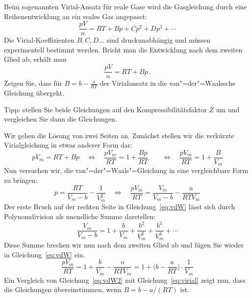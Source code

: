 \documentclass[DIV11]{scrartcl}
\begin{document}
\begin{question}[name=Virial-Ansatz]
Beim sogenannten Virial-Ansatz für reale Gase wird die Gasgleichung durch eine
Reihenentwicklung an ein reales Gas angepasst: \[\frac{pV}{n} = RT + Bp + Cp^2
+ Dp^3 + \cdots\]  Die Virial-Koeffizienten $B,C,D\ldots$ sind druckunabhängig
und müssen experimentell bestimmt werden. Bricht man die Entwicklung nach dem
zweiten Glied ab, erhält man \[\frac{pV}{n} = RT + Bp \,.\]  Zeigen Sie, dass
für $B=b-\frac{a}{RT}$ der Virialansatz in die van"=der"=Waalssche Gleichung
übergeht.

Tipp: stellen Sie beide Gleichungen auf den Kompressibilitätsfaktor $Z$ um und
vergleichen Sie dann die Gleichungen.
\end{question}
\begin{solution}[name=Virial-Ansatz]
  Wir gehen die Lösung von zwei Seiten an. Zunächst stellen wir die verkürzte
  Virialgleichung in etwas anderer Form dar:
  \begin{equation}
    pV_m = RT + Bp
    \quad\Leftrightarrow\quad
    \frac{pV_m}{RT} = 1 + \frac{Bp}{RT}
    \qquad\Leftrightarrow\quad
    \frac{pV_m}{RT} = 1 + \frac{B}{V_m} \label{eq:virial}
  \end{equation}
  Nun versuchen wir, die van"=der"=Waals"=Gleichung in eine vergleichbare Form
  zu bringen:
  \begin{equation}
    p = \frac{RT}{V_m-b} - \frac{1}{V_m^2}
    \quad\Leftrightarrow\quad
    \frac{pV_m}{RT} = \frac{V_m}{V_m-b} - \frac{a}{RTV_m} \label{eq:vdW}
  \end{equation}
  Der erste Bruch auf der rechten Seite in Gleichung~\eqref{eq:vdW} lässt sich
  durch Polynomdivision als unendliche Summe darstellen:
  \begin{equation}
    \frac{V_m}{V_m-b}
      = 1 + \frac{b}{V_m} + \frac{b^2}{V_m^2} + \frac{b^3}{V_m^3} + \cdots
      \label{eq:inv-sum}
  \end{equation}
  Diese Summe brechen wir nun nach dem zweiten Glied ab und fügen Sie wieder
  in Gleichung~\eqref{eq:vdW} ein.
  \begin{equation}
    \frac{pV_m}{RT}
      = 1 + \frac{b}{V_m} - \frac{a}{RTV_m}
      = 1 + \biggl(b-\frac{a}{RT}\biggr)\cdot\frac{1}{V_m} \label{eq:vdW2}
  \end{equation}
  Ein Vergleich von Gleichung~\eqref{eq:vdW2} mit Gleichung~\eqref{eq:virial}
  zeigt nun, dass die Gleichungen übereinstimmen, wenn $B = b - a/(RT)$ ist.
\end{solution}
\end{document}
